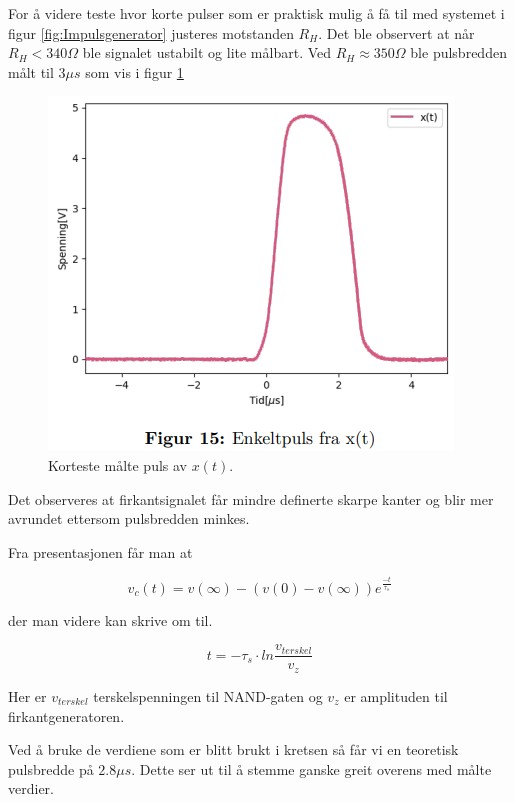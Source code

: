 For å videre teste hvor korte pulser som er praktisk mulig å få til med systemet i figur \ref{fig:Impulsgenerator} justeres motstanden $R_H$. Det ble observert at når $R_H < 340\Omega$ ble signalet ustabilt og lite målbart. Ved $R_H \approx 350\Omega$ ble pulsbredden målt til $3\mu s$ som vis i figur \ref{fig:kortpuls}

\begin{figure}[!hbt]
	\centering
	\includegraphics[scale=0.3]{./Images/02Concept/08puls.png}
	\caption{Korteste målte puls av $x(t)$.}
    \label{fig:kortpuls}
\end{figure}

Det observeres at firkantsignalet får mindre definerte skarpe kanter og blir mer avrundet ettersom pulsbredden minkes.

Fra presentasjonen \cite{lindem_2012_uke} får man at 

\begin{equation}
	v_c(t) = v(\infty)-(v(0)-v(\infty))e^{\frac{-t}{\tau_s}}
\end{equation}

der man videre kan skrive om til.

\begin{equation}
	t=-\tau _s \cdot ln \frac{v_{terskel}}{v_z}
\end{equation}

Her er $v_{terskel}$ terskelspenningen til NAND-gaten og $v_z$ er amplituden til firkantgeneratoren.

Ved å bruke de verdiene som er blitt brukt i kretsen så får vi en teoretisk pulsbredde på $2.8\mu s$. Dette ser ut til å stemme ganske greit overens med målte verdier.

